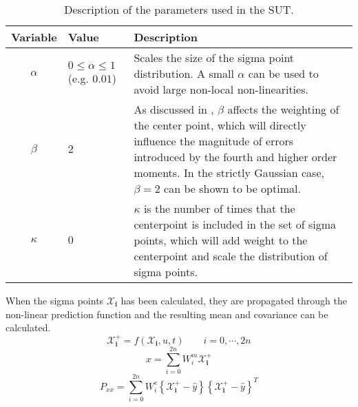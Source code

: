     \begin{table}
        \begin{tabularx}{\tablewidth}{c|p{2cm}X}
            \textbf{Variable} & \textbf{Value} & \textbf{Description} \\ \hline
            $\alpha$ & $0 \leq \alpha \leq 1$ (e.g. $0.01$) & Scales the size of the sigma point distribution.
                                                A small $\alpha$ can be used to avoid large non-local non-linearities. \\
            $\beta$  & $2$ &  As discussed in \citep{Julier02thescaled}, $\beta$ affects the weighting of the center point,
                            which will directly influence the magnitude of errors introduced by the fourth and higher
                            order moments. In the strictly Gaussian case, $\beta = 2$ can be shown to be optimal. \\
            $\kappa$ & $0$ &  $\kappa$ is the number of times that the centerpoint is included in the set of sigma points,
                            which will add weight to the centerpoint and scale the distribution of sigma points. \\
        \end{tabularx}
        \label{tbl:observer:ukf::parameters}
        \caption{Description of the parameters used in the SUT.}
    \end{table}

    When the sigma points $\mathbf{\mathcal{X}_{i}}$ has been calculated,
    they are propagated through the non-linear prediction function and
    the resulting mean and covariance can be calculated.
    \begin{equation}
        \mathbf{\mathcal{X}^{+}_{i}} = f(\mathbf{\mathcal{X}_{i}}, u, t) \qquad i = 0,\cdots,2n
    \end{equation}
    \begin{equation}
        \hat{x} = \sum_{i=0}^{2n}W^{m}_{i}\mathbf{\mathcal{X}^{+}_{i}}
    \end{equation}
    \begin{equation}
        P_{xx} = \sum_{i=0}^{2n}W^{c}_{i}
            \left\lbrace \mathbf{\mathcal{X}^{+}_{i}} - \hat{y} \right\rbrace
            \left\lbrace \mathbf{\mathcal{X}^{+}_{i}} - \hat{y} \right\rbrace^{T}
    \end{equation}

